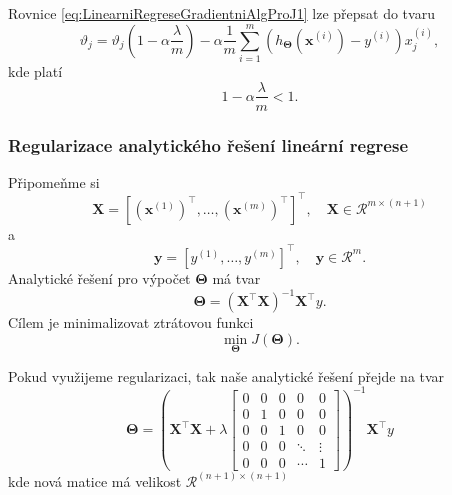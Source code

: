\par{Rovnice \ref{eq:LinearniRegreseGradientniAlgProJ1} lze přepsat do tvaru 
\begin{equation}
	\vartheta_j = \vartheta_j \left( 1 - \alpha \frac{\lambda}{m} \right) - \alpha \frac{1}{m} \sum_{i = 1}^{m} \left( h_{\bm{\Theta}} \left( \bm{x}^{\left( i \right)} \right) - y^{\left( i \right)} \right) x_j^{\left( i \right)},
\end{equation}
kde platí
\begin{equation}
	1 - \alpha \frac{\lambda}{m} < 1.
\end{equation}}



\subsubsection*{Regularizace analytického řešení lineární regrese}

\par{Připomeňme si}
\begin{equation}
	\bm{X} = \left[ \left( \bm{x}^{\left( 1 \right)} \right)^{\top}, \ldots, \left( \bm{x}^{\left( m \right)} \right)^{\top}  \right]^{\top},\quad  \bm{X} \in  \mathcal{R}^{m \times \left( n + 1 \right)}
\end{equation}
a
\begin{equation}
	\bm{y} = \left[ y^{\left( 1 \right)}, \ldots, y^{\left( m \right)}   \right]^{\top}, \quad \bm{y} \in \mathcal{R}^{m}.
\end{equation}
Analytické řešení pro výpočet $\bm{\Theta}$ má tvar
\begin{equation}
	\bm{\Theta} = \left( \bm{X}^{\top} \bm{X} \right)^{-1} \bm{X}^{\top} y.
\end{equation}
Cílem je minimalizovat ztrátovou funkci
\begin{equation}
	\min_{\bm{\Theta}} J \left( \bm{\Theta} \right).
\end{equation}

\par{Pokud využijeme regularizaci, tak naše analytické řešení přejde na tvar
\begin{equation}
	\bm{\Theta} = \left( \bm{X}^{\top} \bm{X} + \lambda 
	\left[ \begin{array}{ccccc}
		0 & 0 & 0 & 0 & 0\\
		0 & 1 & 0 & 0 & 0 \\
		0 & 0 & 1 & 0 & 0\\
		0 & 0 & 0 & \ddots & \vdots\\
		0 & 0 & 0 & \cdots & 1
	\end{array} \right] \right)^{-1} \bm{X}^{\top} y
\end{equation}
kde nová matice má velikost $\mathcal{R}^{\left( n + 1 \right) \times \left( n+ 1 \right)}$}

